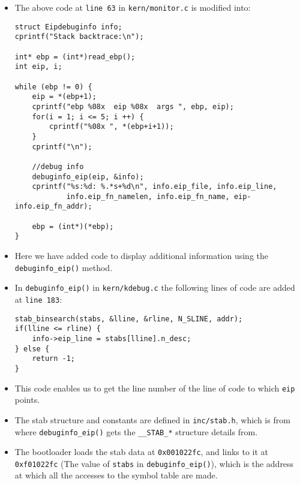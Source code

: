 \documentclass[]{article}
\begin{document}
\begin{itemize}
\item
  The above code at \texttt{line 63} in \texttt{kern/monitor.c} is
  modified into:

\begin{verbatim}
struct Eipdebuginfo info;
cprintf("Stack backtrace:\n");

int* ebp = (int*)read_ebp();
int eip, i;

while (ebp != 0) {
    eip = *(ebp+1);
    cprintf("ebp %08x  eip %08x  args ", ebp, eip);
    for(i = 1; i <= 5; i ++) {
        cprintf("%08x ", *(ebp+i+1));
    }
    cprintf("\n");

    //debug info
    debuginfo_eip(eip, &info);
    cprintf("%s:%d: %.*s+%d\n", info.eip_file, info.eip_line,
            info.eip_fn_namelen, info.eip_fn_name, eip-info.eip_fn_addr);

    ebp = (int*)(*ebp);
}
\end{verbatim}
\item
  Here we have added code to display additional information using the
  \texttt{debuginfo\_eip()} method.
\item
  In \texttt{debuginfo\_eip()} in \texttt{kern/kdebug.c} the following
  lines of code are added at \texttt{line 183}:

\begin{verbatim}
stab_binsearch(stabs, &lline, &rline, N_SLINE, addr);
if(lline <= rline) {
    info->eip_line = stabs[lline].n_desc;
} else {
    return -1;
}
\end{verbatim}
\item
  This code enables us to get the line number of the line of code to
  which \texttt{eip} points.
\item
  The stab structure and constants are defined in \texttt{inc/stab.h},
  which is from where \texttt{debuginfo\_eip()} gets the
  \texttt{\_\_STAB\_*} structure details from.
\item
  The bootloader loads the stab data at \texttt{0x001022fc}, and links
  to it at \texttt{0xf01022fc} (The value of \texttt{stabs} in
  \texttt{debuginfo\_eip()}), which is the address at which all the
  accesses to the symbol table are made.
\end{itemize}
\end{document}
